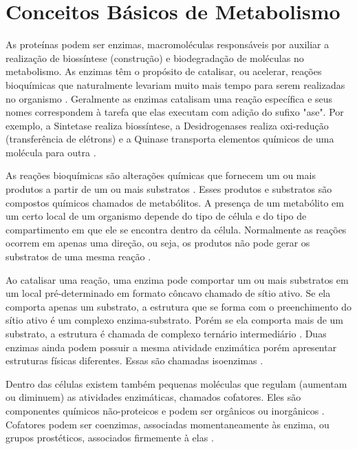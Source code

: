 

\section{Conceitos Básicos de Metabolismo} \label{conceitosMeta}


\indent As proteínas podem ser enzimas, macromoléculas responsáveis por auxiliar a realização de biossíntese (construção) e biodegradação de moléculas no metabolismo. As enzimas têm o propósito de catalisar, ou acelerar, reações bioquímicas que naturalmente levariam muito mais tempo para serem realizadas no organismo \cite{setubal97}. Geralmente as enzimas catalisam uma reação específica e seus nomes correspondem à tarefa que elas executam com adição do sufixo "ase". Por exemplo, a Sintetase realiza biossíntese, a Desidrogenases realiza oxi-redução (transferência de elétrons) e a Quinase transporta elementos químicos de uma molécula para outra \cite{enzymesKirk}.

\indent As reações bioquímicas são alterações químicas que fornecem um ou mais produtos a partir de um ou mais substratos \cite{lacroixCTS08}. Esses produtos e substratos são compostos químicos chamados de metabólitos. A presença de um metabólito em um certo local de um organismo depende do tipo de célula e do tipo de compartimento em que ele se encontra dentro da célula. Normalmente as reações ocorrem em apenas uma direção, ou seja, os produtos não pode gerar os substratos de uma mesma reação \cite{lacroixCTS08}.

\indent Ao catalisar uma reação, uma enzima pode comportar um ou mais substratos em um local pré-determinado em formato côncavo chamado de sítio ativo. Se ela comporta apenas um substrato, a estrutura que se forma com o preenchimento do sítio ativo é um complexo enzima-substrato. Porém se ela comporta mais de um substrato, a estrutura é chamada de complexo ternário intermediário \cite{Cap2schomburg}. Duas enzimas ainda podem possuir a mesma atividade enzimática porém apresentar estruturas físicas diferentes. Essas são chamadas isoenzimas \cite{Cap2schomburg}.

\indent Dentro das células existem também pequenas moléculas que regulam (aumentam ou diminuem) as atividades enzimáticas, chamados cofatores. Eles são componentes químicos não-proteicos e podem ser orgânicos ou inorgânicos \cite{lacroixCTS08}. Cofatores podem ser coenzimas, associadas momentaneamente às enzima, ou grupos prostéticos, associados firmemente à elas \cite{Cap2schomburg}.

